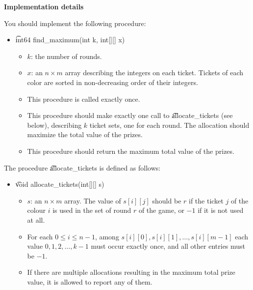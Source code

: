 \textbf{Implementation details}

You should implement the following procedure:

\begin{itemize}
\item \t{int64 find\_maximum(int k, int[][] x)}
\begin{itemize}

\item $k$: the number of rounds.
\item $x$: an $n\times m$ array describing the integers on each ticket. Tickets of each color are sorted in non-decreasing order of their integers.
\item This procedure is called exactly once.
\item This procedure should make exactly one call to \t{allocate\_tickets} (see below), describing $k$ ticket sets, one for each round. The allocation should maximize the total value of the prizes.
\item This procedure should return the maximum total value of the prizes.
\end{itemize}
\end{itemize}


The procedure \t{allocate\_tickets} is defined as follows:

\begin{itemize}
\item \t{void allocate\_tickets(int[][] s)}
\begin{itemize}
\item $s$: an $n\times m$ array. The value of $s[i][j]$ should be $r$ if the ticket $j$ of the colour $i$ is used in the set of round $r$ of the game, or $-1$ if it is not used at all.
\item For each $0 \leq i \leq n - 1$, among $s[i][0], s[i][1],\ldots, s[i][m - 1]$ each value $0,1,2,\ldots,k-1$ must occur exactly once, and all other entries must be $-1$.
\item If there are multiple allocations resulting in the maximum total prize value, it is allowed to report any of them.
\end{itemize}
\end{itemize}


